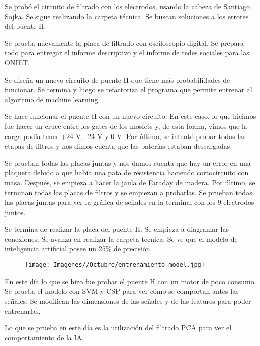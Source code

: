 \documentclass{article}
\begin{document}
Se probó el circuito de filtrado con los electrodos, usando la cabeza de Santiago Sojka. Se sigue realizando la carpeta técnica. Se buscan soluciones a los errores del puente H.



Se prueba nuevamente la placa de filtrado con osciloscopio digital. Se prepara todo para entregar el informe descriptivo y el informe de redes sociales para las ONIET.



Se diseña un nuevo circuito de puente H que tiene más probabilidades de funcionar. Se termina y luego se refactoriza el programa que permite entrenar al algoritmo de machine learning.



Se hace funcionar el puente H con un nuevo circuito. En este caso, lo que hicimos fue hacer un cruce entre los gates de los mosfets y, de esta forma, vimos que la carga podía tener +24 V, -24 V y 0 V. Por último, se intentó probar todas las etapas de filtros y nos dimos cuenta que las baterías estaban descargadas.



Se prueban todas las placas juntas y nos damos cuenta que hay un error en una plaqueta debido a que había una pata de resistencia haciendo cortocircuito con masa. Después, se empieza a hacer la jaula de Faraday de madera. Por último, se terminan todas las placas de filtros y se empiezan a probarlas. Se prueban todas las placas juntas para ver la gráfica de señales en la terminal con los 9 electrodos juntos.



Se termina de realizar la placa del puente H. Se empieza a diagramar las conexiones. Se avanza en realizar la carpeta técnica. Se ve que el modelo de inteligencia artificial posee un 25\% de precisión.

\begin{figure}[H]
    \centering
    \texttt{[image: Imagenes//Octubre/entrenamiento model.jpg]}
\end{figure}

En este día lo que se hizo fue probar el puente H con un motor de poco consumo. Se prueba el modelo con SVM y CSP para ver cómo se comportan antes las señales. Se modifican las dimensiones de las señales y de las features para poder entrenarlas.



Lo que se prueba en este día es la utilización del filtrado PCA para ver el comportamiento de la IA.


\newpage
\end{document}
